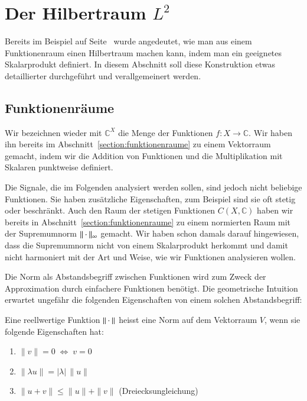 %
%
%
\section{Der Hilbertraum $L^2$
\label{section:l2}}
Bereits im Beispiel auf Seite~\pageref{geometrie:l2-beispiel} wurde
angedeutet, wie man aus einem Funktionenraum einen Hilbertraum
machen kann, indem man ein geeignetes Skalarprodukt definiert.
In diesem Abschnitt soll diese Konstruktion etwas detaillierter 
durchgeführt und verallgemeinert werden.

\subsection{Funktionenräume}
Wir bezeichnen wieder mit $\mathbb C^X$ die Menge der Funktionen
$f\colon X\to \mathbb C$.
Wir haben ihn bereits im Abschnitt~\ref{section:funktionenraume}
zu einem Vektorraum gemacht, indem wir die
Addition von Funktionen und die Multiplikation mit Skalaren
punktweise definiert.

Die Signale, die im Folgenden analysiert werden sollen, sind jedoch
nicht beliebige Funktionen.
Sie haben zusätzliche Eigenschaften, zum Beispiel sind sie oft stetig
oder beschränkt.
Auch den Raum der stetigen Funktionen $C(X,\mathbb C)$ haben wir bereits
in Abschnitt~\ref{section:funktionenraume} zu einem normierten Raum
mit der Supremumnorm $\|\mathstrut\cdot\mathstrut\|_\infty$ gemacht.
Wir haben schon damals darauf hingewiesen, dass die Supremumnorm
nicht von einem Skalarprodukt herkommt und damit nicht harmoniert
mit der Art und Weise, wie wir Funktionen analysieren wollen.

Die Norm als Abstandsbegriff zwischen Funktionen wird zum Zweck der
Approximation durch einfachere Funktionen benötigt.
Die geometrische Intuition erwartet ungefähr die folgenden Eigenschaften
von einem solchen Abstandsbegriff:

\begin{definition}
Eine reellwertige Funktion $\|\mathstrut\cdot\mathstrut\|$ heisst
eine Norm auf dem Vektorraum $V$, wenn sie folgende Eigenschaften hat:
\begin{enumerate}
\item $\|v\|=0\;\Leftrightarrow\; v = 0$
\item $\| \lambda u \| = |\lambda| \,\|u\|$
\item $\|u + v\| \le \|u\| + \|v\|$ (Dreiecksungleichung)
\end{enumerate}
%
\end{definition}

